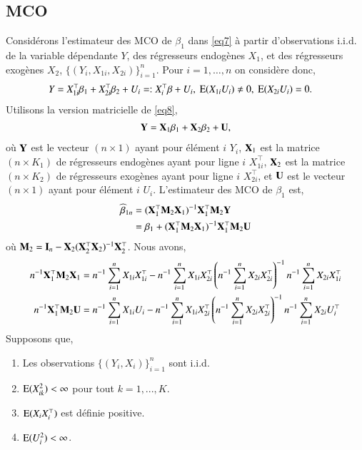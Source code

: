  \subsection{MCO}

 Considérons l'estimateur des MCO de $\beta_1$ dans \eqref{eq7} à partir d'observations i.i.d. de la variable dépendante $Y$,
 des régresseurs endogènes $X_1$, et des régresseurs exogènes $X_2$, $\{(Y_i, X_{1i}, X_{2i})\}_{i=1}^n$. 
 Pour $i=1, \ldots, n$ on considère donc,
\begin{align}
	Y &= X_{1i}^\top\beta_1 + X_{2i}^\top\beta_2 + U_i =: X_i^\top\beta + U_i, \ \operatorname{E}(X_{1i}U_i) \neq 0, \ \operatorname{E}(X_{2i}U_i) = 0.
	\label{eq8}
 \end{align}
 Utilisons la version matricielle de \eqref{eq8},
\begin{align*}
	\mathbf Y = \mathbf X_1\beta_1 + \mathbf X_2\beta_2 + \mathbf U,
	\end{align*}
	où $\mathbf Y$ est le vecteur $(n\times 1)$ ayant pour élément $i$ $Y_i$, $\mathbf X_1$ est la matrice $(n\times K_1)$ de régresseurs endogènes ayant pour ligne $i$ $X_{1i}^\top$, $\mathbf X_2$ est la matrice $(n\times K_2)$ de régresseurs exogènes ayant pour ligne $i$ $X_{2i}^\top$, et $\mathbf U$ est le vecteur $(n\times 1)$ ayant pour élément $i$ $U_i$. L'estimateur des MCO de $\beta_1$ est,
	\begin{align*}
	\widehat{\beta}_{1n} &= (\mathbf X_1^\top\mathbf M_2\mathbf X_1)^{-1}\mathbf X_1^\top\mathbf M_2\mathbf Y \\
	&=\beta_1 +(\mathbf X_1^\top\mathbf M_2\mathbf X_1)^{-1}\mathbf X_1^\top\mathbf M_2\mathbf U
	\end{align*}
	où $\mathbf M_2 = \mathbf{I}_n - \mathbf X_2(\mathbf X_2^\top\mathbf X_2)^{-1}\mathbf X_2^\top$. Nous avons,
	\begin{align*}
	n^{-1}\mathbf X_1^\top\mathbf M_2\mathbf X_1 &= n^{-1}\sum_{i=1}^n X_{1i}X_{1i}^\top - n^{-1}\sum_{i=1}^n X_{1i}X_{2i}^\top\left(n^{-1}\sum_{i=1}^n X_{2i}X_{2i}^\top\right)^{-1} n^{-1}\sum_{i=1}^n X_{2i}X_{1i}^\top\\
	n^{-1}\mathbf X_1^\top\mathbf M_2\mathbf U &= n^{-1}\sum_{i=1}^n X_{1i}U_i - n^{-1}\sum_{i=1}^n X_{1i}X_{2i}^\top\left(n^{-1}\sum_{i=1}^n X_{2i}X_{2i}^\top\right)^{-1} n^{-1}\sum_{i=1}^n X_{2i}U_i^\top
	\end{align*}
	Supposons que,
	\begin{enumerate}[label = (A.\arabic*)]
	\item Les observations $\{(Y_i, X_i)\}_{i=1}^n$ sont i.i.d.
	\item $\operatorname{E}(X_{ik}^2) < \infty$ pour tout $k=1,...,K$.
	\item $\operatorname{E}(X_iX_i^\top)$ est définie positive.
	\item $\operatorname{E}(U_i^2) < \infty$.
	\end{enumerate}
